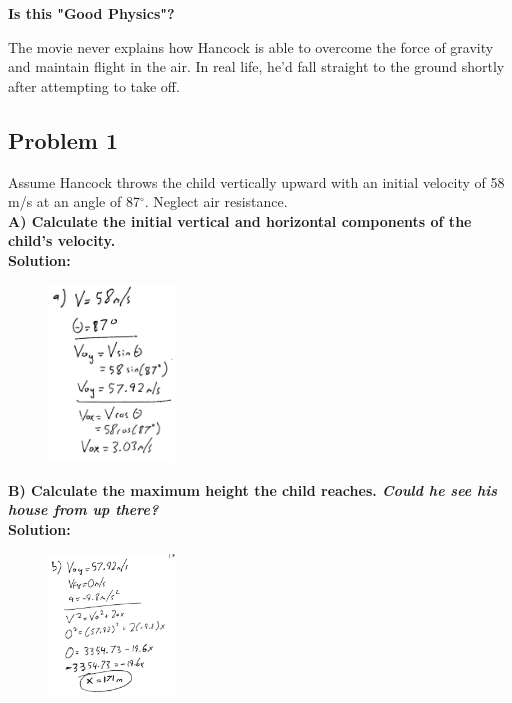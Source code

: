 \documentclass[a4paper,12pt]{article}
\begin{document}
\vspace{0.3cm}
\noindent\textbf{Is this "Good Physics"?} \par

The movie never explains how Hancock is able to overcome the force of gravity
	and maintain flight in the air. In real life, he’d fall straight to the ground
	shortly after attempting to take off.

\subsection{Problem 1}
Assume Hancock throws the child vertically upward with an initial velocity of 58 m/s at an angle of 87$^\circ$. Neglect air resistance. \\


\noindent\textbf{A) Calculate the initial vertical and horizontal components of the child's velocity.} \\

\noindent\textbf{Solution:}

\begin{figure}[H]
    \centering
    \includegraphics[width=0.3\textwidth]{U2_P1_A} %
\end{figure}

\newpage

\noindent\textbf{B) Calculate the maximum height the child reaches. \emph{Could he see his house from up there?}} \\

\noindent\textbf{Solution:}

\begin{figure}[H]
    \centering
    \includegraphics[width=0.3\textwidth]{U2_P1_B} %
\end{figure}
\end{document}
